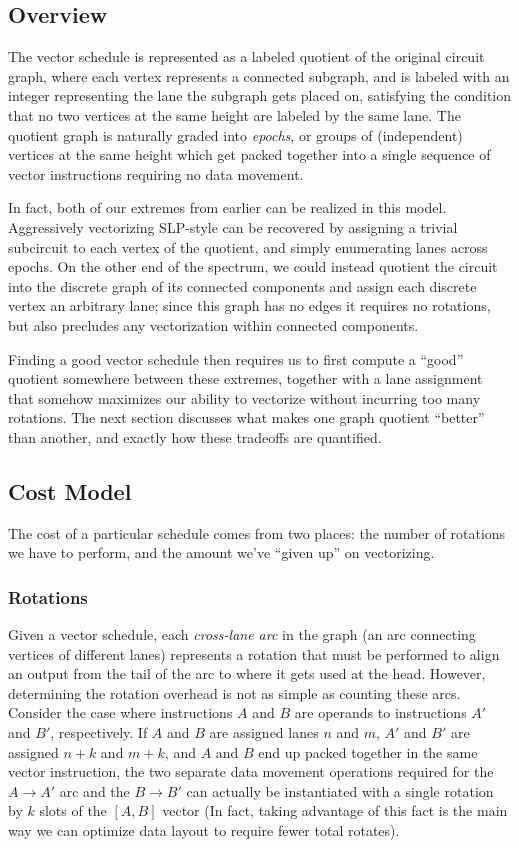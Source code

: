 \subsection{Overview}
The vector schedule  is represented as a labeled quotient of the original circuit graph, where each vertex represents a connected subgraph, and is labeled with an integer representing the lane the subgraph gets placed on, satisfying the condition that no two vertices at the same height are labeled by the same lane.
The quotient graph is naturally graded into {\em epochs}, or groups of (independent) vertices at the same height which get packed together into a single sequence of vector instructions requiring no data movement.

In fact, both of our extremes from earlier can be realized in this model.
Aggressively vectorizing SLP-style can be recovered by assigning a trivial subcircuit to each vertex of the quotient, and simply enumerating lanes across epochs.
On the other end of the spectrum, we could instead quotient the circuit into the discrete graph of its connected components and assign each discrete vertex an arbitrary lane; since this graph has no edges it requires no rotations, but also precludes any vectorization within connected components.

Finding a good vector schedule then requires us to first compute a ``good'' quotient somewhere between these extremes, together with a lane assignment that somehow maximizes our ability to vectorize without incurring too many rotations.
The next section discusses what makes one graph quotient ``better'' than another, and exactly how these tradeoffs are quantified.

\subsection{Cost Model}
The cost of a particular schedule comes from two places: the number of rotations we have to perform, and the amount we've ``given up'' on vectorizing.
\subsubsection*{Rotations}
Given a vector schedule, each {\em cross-lane arc} in the graph (an arc connecting vertices of different lanes) represents a rotation that must be performed to align an output from the tail of the arc to where it gets used at the head.
However, determining the rotation overhead is not as simple as counting these arcs.
Consider the case where instructions $A$ and $B$ are operands to instructions $A'$ and $B'$, respectively.
If $A$ and $B$ are assigned lanes $n$ and $m$, $A'$ and $B'$ are assigned $n+k$ and $m+k$, and $A$ and $B$ end up packed together in the same vector instruction, the two separate data movement operations required for the $A\to A'$ arc and the $B\to B'$ can actually be instantiated with a single rotation by $k$ slots of the $[A, B]$ vector (In fact, taking advantage of this fact is the main way we can optimize data layout to require fewer total rotates).

